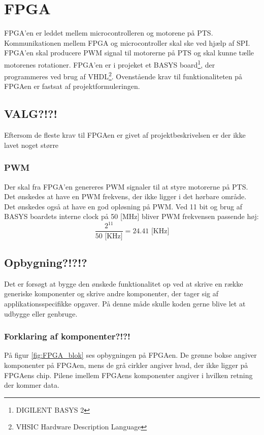 \section{FPGA}
\label{sec:FPGA}
FPGA'en er leddet mellem microcontrolleren og motorene på PTS. 
Kommunikationen mellem FPGA og microcontroller skal ske ved hjælp af SPI. 
FPGA'en skal producere PWM signal til motorerne på PTS og skal kunne tælle motorenes rotationer. 
FPGA'en er i projeket et BASYS board\footnote{DIGILENT BASYS 2}, der programmeres ved brug af VHDL\footnote{VHSIC Hardware Description Language}.
Ovenstående krav til funktionaliteten på FPGAen er fastsat af 
projektformuleringen.


\subsection{VALG?!?!}
Eftersom de fleste krav til FPGAen er givet af projektbeskrivelsen er der ikke 
lavet noget større 
\subsubsection*{PWM}
Der skal fra FPGA'en genereres PWM signaler til at styre motorerne på PTS.
Det ønskedes at have en PWM frekvens, der ikke ligger i det hørbare område. 
Det ønskedes også at have en god opløsning på PWM. 
Ved 11 bit og brug af BASYS boardets interne clock på 50 [MHz] bliver PWM frekvensen passende høj:
\begin{equation}
  \frac{2^{11}}{50  \text{ [KHz]}} = 24.41 \text{ [KHz]} 
\end{equation}

\subsection{Opbygning?!?!?}
Det er forsøgt at bygge den ønskede funktionalitet op ved at skrive en række generiske komponenter og skrive andre komponenter, der tager sig af applikationsspecifikke opgaver. 
På denne måde skulle koden gerne blive let at udbygge eller genbruge. 
\subsubsection*{Forklaring af komponenter?!?!}
På figur \ref{fig:FPGA_blok} ses opbygningen på FPGAen. De grønne bokse angiver 
komponenter på FPGAen, mens de grå cirkler angiver hvad, der ikke ligger på 
FPGAens chip. Pilene imellem FPGAens komponenter angiver i hvilken retning der 
kommer data.


